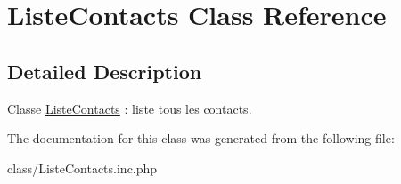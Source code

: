 \hypertarget{class_liste_contacts}{
\section{ListeContacts Class Reference}
\label{class_liste_contacts}
}


\subsection{Detailed Description}
Classe \hyperlink{class_liste_contacts}{ListeContacts} : liste tous les contacts. 

The documentation for this class was generated from the following file:\begin{DoxyCompactItemize}
\item 
class/ListeContacts.inc.php\end{DoxyCompactItemize}
